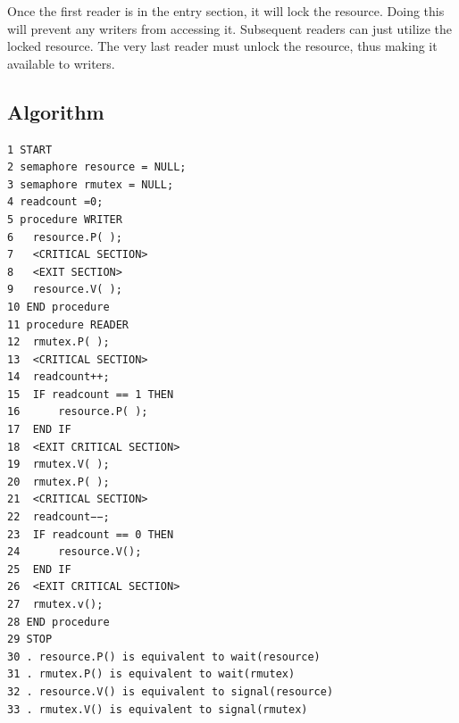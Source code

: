 Once the first reader is in the entry section, it will lock the resource. Doing this will prevent any writers from accessing it. Subsequent readers can just utilize the locked resource. The very last reader must unlock the resource, thus making it available to writers.

\subsection{Algorithm}
\begin{verbatim}
1 START
2 semaphore resource = NULL;
3 semaphore rmutex = NULL;
4 readcount =0;
5 procedure WRITER
6   resource.P( );
7   <CRITICAL SECTION>
8   <EXIT SECTION>
9   resource.V( );
10 END procedure
11 procedure READER
12  rmutex.P( );
13  <CRITICAL SECTION>
14  readcount++;
15  IF readcount == 1 THEN
16      resource.P( );
17  END IF
18  <EXIT CRITICAL SECTION>
19  rmutex.V( );
20  rmutex.P( );
21  <CRITICAL SECTION>
22  readcount−−;
23  IF readcount == 0 THEN
24      resource.V();
25  END IF
26  <EXIT CRITICAL SECTION>
27  rmutex.v();
28 END procedure
29 STOP
30 . resource.P() is equivalent to wait(resource)
31 . rmutex.P() is equivalent to wait(rmutex)
32 . resource.V() is equivalent to signal(resource)
33 . rmutex.V() is equivalent to signal(rmutex)
\end{verbatim}

